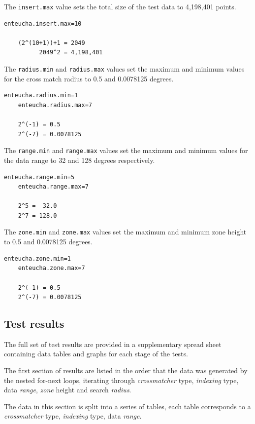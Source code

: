 \documentclass{article}
\newcommand{\crossmatcher} {crossmatcher\xspace}
\begin{document}
The \texttt{insert.max} value sets the total size of the test data to 4,198,401 points.
\begin{lstlisting}[]
    enteucha.insert.max=10

    (2^(10+1))+1 = 2049
          2049^2 = 4,198,401
\end{lstlisting}

The \texttt{radius.min} and \texttt{radius.max} values set the maximum and minimum values for the cross match radius to 0.5 and 0.0078125 degrees.
\begin{lstlisting}[]
    enteucha.radius.min=1
    enteucha.radius.max=7

    2^(-1) = 0.5
    2^(-7) = 0.0078125
\end{lstlisting}

The \texttt{range.min} and \texttt{range.max} values set the maximum and minimum values for the data range to 32 and 128 degrees respectively.
\begin{lstlisting}[]
    enteucha.range.min=5
    enteucha.range.max=7

    2^5 =  32.0
    2^7 = 128.0
\end{lstlisting}

The \texttt{zone.min} and \texttt{zone.max} values set the maximum and minimum zone height to 0.5 and 0.0078125 degrees.
\begin{lstlisting}[]
    enteucha.zone.min=1
    enteucha.zone.max=7

    2^(-1) = 0.5
    2^(-7) = 0.0078125
\end{lstlisting}

\subsection{Test results}
\label{test-results}

The full set of test results are provided in a supplementary spread sheet containing data tables and graphs for each stage of the tests.

The first section of results are listed in the order that the data was generated by the nested for-next loops, iterating through \textit{\crossmatcher} type, \textit{indexing} type, data  \textit{range}, \textit{zone} height and search \textit{radius}.

The data in this section is split into a series of tables, each table corresponds to a \textit{\crossmatcher} type, \textit{indexing} type, data  \textit{range}.
\end{document}
